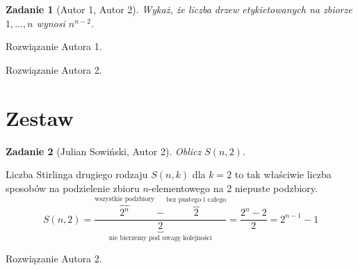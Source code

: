 \documentclass{mwart}
\newtheorem{zad}{Zadanie}[section]
\begin{document}
\begin{zad}[Autor 1, Autor 2]
    Wykaż, że liczba drzew etykietowanych na zbiorze ${1, ..., n}$ wynosi $n^{n-2}$.
\end{zad}
\begin{mdframed}
    Rozwiązanie Autora 1.
\end{mdframed}
\begin{mdframed}
    Rozwiązanie Autora 2.
\end{mdframed}























\newpage
\section{Zestaw}          %

\begin{zad}[Julian Sowiński, Autor 2]
    Oblicz $S(n, 2)$.
\end{zad}
\begin{mdframed}
    Liczba Stirlinga drugiego rodzaju $S(n, k)$ dla $k=2$ to tak właściwie liczba sposobów na podzielenie zbioru $n$-elementowego na 2 niepuste podzbiory.
    $$S(n, 2) = \frac{\overbrace{2^n}^{\text{wszystkie podzbiory}} - \overbrace{2}^{\text{bez pustego i całego}}}{\underbrace{2}_{\text{nie bierzemy pod uwagę kolejności}}} = \frac{2^n - 2}{2} = 2^{n-1} - 1$$
\end{mdframed}
\begin{mdframed}
    Rozwiązanie Autora 2.
\end{mdframed}
\end{document}
